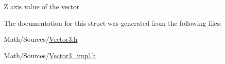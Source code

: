 Z axis value of the vector 

The documentation for this struct was generated from the following files\+:\begin{DoxyCompactItemize}
\item 
Math/\+Sources/\mbox{\hyperlink{_vector3_8h}{Vector3.\+h}}\item 
Math/\+Sources/\mbox{\hyperlink{_vector3__impl_8h}{Vector3\+\_\+impl.\+h}}\end{DoxyCompactItemize}
